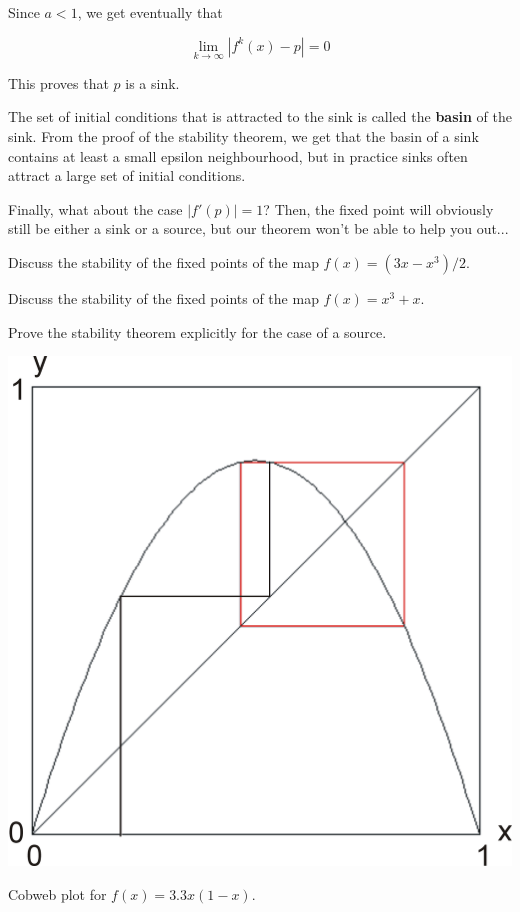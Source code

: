 Since $a<1$, we get eventually that

\begin{equation}
\lim_{k \to \infty} \left|f^k(x)-p\right| = 0
\end{equation} 

This proves that $p$ is a sink.

The set of initial conditions that is attracted to the sink is called the \textbf{basin} of the sink. From the proof of the stability theorem, we get that the basin of a sink contains at least a small epsilon neighbourhood, but in practice sinks often attract a large set of initial conditions.

Finally, what about the case $|f'(p)|=1$? Then, the fixed point will obviously still be either a sink or a source, but our theorem won't be able to help you out...

\begin{exer}
Discuss the stability of the fixed points of the map $f(x) = (3x-x^3)/2$.
\end{exer}

\begin{exer}
Discuss the stability of the fixed points of the map $f(x) = x^3 + x$.
\end{exer}

\begin{exer}
Prove the stability theorem explicitly for the case of a source.
\end{exer}

\pagebreak


\begin{marginfigure}
\centering
\includegraphics{dynamic/figures/cobweb2}
\caption{Cobweb plot for $f(x)=3.3x(1-x)$.}
\label{fig-cobweb2}
\end{marginfigure}

